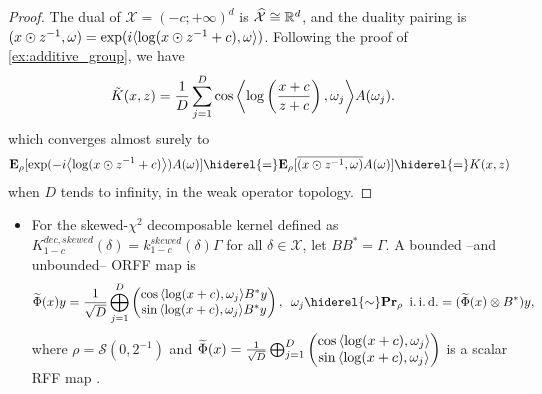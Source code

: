 \begin{proof}
The dual of $\mathcal{X}=(-c;+\infty)^d$
is $\dual{\mathcal{X}}\cong\mathbb{R}^d$, and the duality pairing is $\pairing{x \odot \myinv{z},\omega}=\exp(i\inner{\log(x\odot z^{-1}+c), \omega})$. Following the proof of \cref{ex:additive_group}, we have
\begin{equation*}
\begin{aligned}
\tilde{K}(x,z)&= \frac{1}{D} \sum_{j=1}^D \cos{\inner*{\log\left(\frac{x+c}{z+c}\right), \omega_j}}A(\omega_j).
\end{aligned}
\end{equation*}
which converges almost surely to
\begin{dmath*}
\expectation_{\rho}[\exp(-i\inner*{\log(x\odot z^{-1}+c)})A(\omega) ]\hiderel{=}\expectation_{\rho}[\conj{\pairing{x\odot z^{-1},\omega}}A(\omega)]\hiderel{=}K(x, z)
\end{dmath*}
when $D$ tends to infinity, in the weak operator topology.
\end{proof}
\begin{itemize}
\item For the skewed-$\chi^2$ decomposable kernel defined as $K_{1-c}^{dec,skewed}(\delta)=k_{1-c}^{skewed}(\delta)\Gamma$ for all $\delta\in\mathcal{X}$, let $BB^*=\Gamma$. A bounded --and unbounded-- \acs{ORFF} map is
\begin{dmath*}
\tildePhi{\omega}(x)y=\frac{1}{\sqrt{D}}\Vect_{j=1}^D\begin{pmatrix}\cos{\inner{\log(x+c),\omega_j}}B^\adjoint y\\ \sin{\inner{\log(x+c),\omega_j}}B^\adjoint y\end{pmatrix}, \enskip \omega_j \hiderel{\sim} \probability_{\rho} \enskip\text{\iid}
=(\tildePhi{\omega}(x) \otimes B^\adjoint)y,
\end{dmath*}
where $\rho=\mathcal{S}(0,2^{-1})$ and $\tildePhi{\omega}(x)=\frac{1}{\sqrt{D}}\Vect_{j=1}^D\begin{pmatrix}\cos{\inner{\log(x+c),\omega_j}} \\ \sin{\inner{\log(x+c),\omega_j}}\end{pmatrix}$ is a scalar \acs{RFF} map \citep{li2010random}.
\end{itemize}
